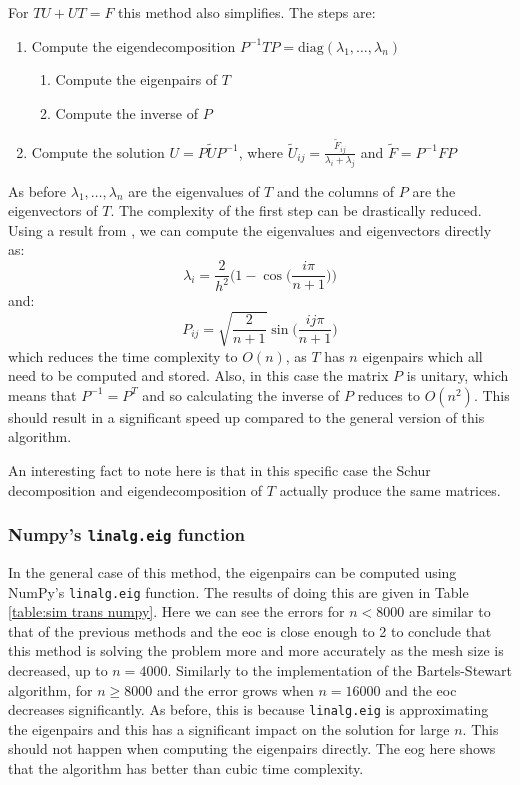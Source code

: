 \documentclass[11pt]{article}
\numberwithin{equation}{section}
\begin{document}
For $TU+UT=F$ this method also simplifies. The steps are: 
\begin{enumerate}
\item Compute the eigendecomposition $P^{-1}TP = \text{diag}(\lambda_1, \dots, \lambda_n)$
	\begin{enumerate}
	\item Compute the eigenpairs of $T$
	\item Compute the inverse of $P$
	\end{enumerate}
\item Compute the solution $U = P \widetilde{U} P^{-1}$, where $\widetilde{U}_{ij} = \frac{\widetilde{F}_{ij}}{\lambda_i + \lambda_j}$ and $\widetilde{F}=P^{-1}FP$
\end{enumerate}
As before $\lambda_1, \dots, \lambda_n$ are the eigenvalues of $T$ and the columns of $P$ are the eigenvectors of $T$. The complexity of the first step can be drastically reduced. Using a result from \cite{Elliott}, we can compute the eigenvalues and eigenvectors directly as:
\begin{equation} 
\lambda_i = \frac{2}{h^2} \Big( 1 - \cos \Big( \frac{i \pi}{n+1} \Big) \Big) 
\end{equation}
and:
\begin{equation}
P_{ij} = \sqrt{\frac{2}{n+1}} \sin \Big( \frac{ij \pi}{n+1}  \Big) 
\end{equation}
which reduces the time complexity to $O(n)$, as $T$ has $n$ eigenpairs which all need to be computed and stored. Also, in this case the matrix $P$ is unitary, which means that $P^{-1} = P^T$ and so calculating the inverse of $P$ reduces to $O(n^2)$. This should result in a significant speed up compared to the general version of this algorithm.

An interesting fact to note here is that in this specific case the Schur decomposition and eigendecomposition of $T$ actually produce the same matrices. 

\subsubsection*{Numpy's \texttt{linalg.eig} function}
In the general case of this method, the eigenpairs can be computed using NumPy's \texttt{linalg.eig} function. The results of doing this are given in Table \ref{table:sim trans numpy}. Here we can see the errors for $n<8000$ are similar to that of the previous methods and the eoc is close enough to 2 to conclude that this method is solving the problem more and more accurately as the mesh size is decreased, up to $n=4000$. Similarly to the implementation of the Bartels-Stewart algorithm, for $n\geq 8000$ and the error grows when $n=16000$ and the eoc decreases significantly. As before, this is because \texttt{linalg.eig} is approximating the eigenpairs and this has a significant impact on the solution for large $n$. This should not happen when computing the eigenpairs directly. The eog here shows that the algorithm has better than cubic time complexity.
\end{document}
